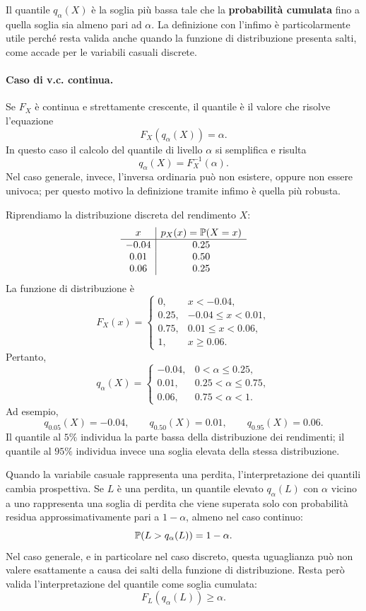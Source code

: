 Il quantile $q_\alpha(X)$ \`{e} la soglia pi\`{u} bassa tale che la \textbf{probabilit\`{a}
cumulata} fino a quella soglia sia almeno pari ad $\alpha$. La definizione con
l'infimo \`{e} particolarmente utile perch\'{e} resta valida anche quando la
funzione di distribuzione presenta salti, come accade per le variabili casuali
discrete.

\paragraph{Caso di v.c. continua.}Se $F_X$ \`{e} continua e strettamente crescente, il quantile \`{e} il valore che
risolve l'equazione
\[
F_X(q_\alpha(X))=\alpha.
\]
In questo caso il calcolo del quantile di livello $\alpha$ si semplifica e risulta
\[
q_\alpha(X)=F_X^{-1}(\alpha).
\]
Nel caso generale, invece, l'inversa ordinaria pu\`{o} non esistere, oppure non
essere univoca; per questo motivo la definizione tramite infimo \`{e} quella pi\`{u}
robusta.

\begin{example}
Riprendiamo la distribuzione discreta del rendimento $X$:
\[
\begin{array}{c|c}
x & p_X(x)=\mathbb{P}(X=x)\\
\hline
-0.04 & 0.25\\
 0.01 & 0.50\\
 0.06 & 0.25
\end{array}
\]
La funzione di distribuzione \`{e}
\[
F_X(x)=
\begin{cases}
0, & x<-0.04,\\
0.25, & -0.04\leq x<0.01,\\
0.75, & 0.01\leq x<0.06,\\
1, & x\geq 0.06.
\end{cases}
\]
Pertanto,
\[
q_\alpha(X)=
\begin{cases}
-0.04, & 0<\alpha\leq 0.25,\\
 0.01, & 0.25<\alpha\leq 0.75,\\
 0.06, & 0.75<\alpha<1.
\end{cases}
\]
Ad esempio,
\[
q_{0.05}(X)=-0.04,
\qquad
q_{0.50}(X)=0.01,
\qquad
q_{0.95}(X)=0.06.
\]
Il quantile al $5\%$ individua la parte bassa della distribuzione dei rendimenti;
il quantile al $95\%$ individua invece una soglia elevata della stessa
distribuzione.
\end{example}

Quando la variabile casuale rappresenta una perdita, l'interpretazione dei
quantili cambia prospettiva. Se $L$ \`{e} una perdita, un quantile elevato
$q_\alpha(L)$ con $\alpha$ vicino a uno rappresenta una soglia di perdita che
viene superata solo con probabilit\`{a} residua approssimativamente pari a
$1-\alpha$, almeno nel caso continuo:
\[
\mathbb{P}(L>q_\alpha(L))=1-\alpha.
\]
Nel caso generale, e in particolare nel caso discreto, questa uguaglianza pu\`{o}
non valere esattamente a causa dei salti della funzione di distribuzione. Resta
per\`{o} valida l'interpretazione del quantile come soglia cumulata:
\[
F_L(q_\alpha(L))\geq \alpha.
\]

